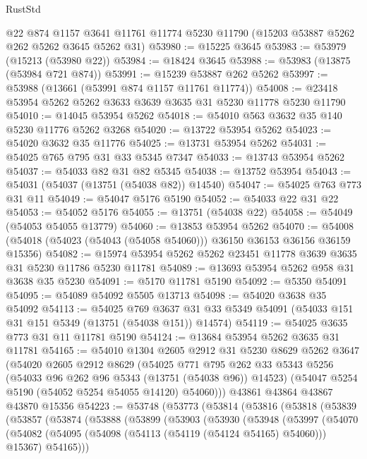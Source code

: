 \begin{lexlean}{RustStd}
\begin{coremodule}
    @22
    @874
    @1157
    @3641
    @11761
    @11774
    @5230
    @11790
    (@15203 @53887 @5262 @262 @5262 @3645 @5262 @31)
@53980 := @15225 @3645
@53983 := @53979 (@15213 (@53980 @22))
@53984 := @18424 @3645
@53988 := @53983 (@13875 (@53984 @721 @874))
@53991 := @15239 @53887 @262 @5262
@53997 := @53988 (@13661 (@53991 @874 @1157 @11761 @11774))
@54008 := @23418 @53954 @5262 @5262 @3633 @3639 @3635 @31 @5230 @11778 @5230 @11790
@54010 := @14045 @53954 @5262
@54018 := @54010 @563 @3632 @35 @140 @5230 @11776 @5262 @3268
@54020 := @13722 @53954 @5262
@54023 := @54020 @3632 @35 @11776
@54025 := @13731 @53954 @5262
@54031 := @54025 @765 @795 @31 @33 @5345 @7347
@54033 := @13743 @53954 @5262
@54037 := @54033 @82 @31 @82 @5345
@54038 := @13752 @53954
@54043 := @54031 (@54037 (@13751 (@54038 @82)) @14540)
@54047 := @54025 @763 @773 @31 @11
@54049 := @54047 @5176 @5190
@54052 := @54033 @22 @31 @22
@54053 := @54052 @5176
@54055 := @13751 (@54038 @22)
@54058 := @54049 (@54053 @54055 @13779)
@54060 := @13853 @53954 @5262
@54070 := @54008 (@54018 (@54023 (@54043 (@54058 @54060))) @36150 @36153 @36156 @36159 @15356)
@54082 := @15974 @53954 @5262 @5262 @23451 @11778 @3639 @3635 @31 @5230 @11786 @5230 @11781
@54089 := @13693 @53954 @5262 @958 @31 @3638 @35 @5230
@54091 := @5170 @11781 @5190
@54092 := @5350 @54091
@54095 := @54089 @54092 @5505 @13713
@54098 := @54020 @3638 @35 @54092
@54113 := @54025
    @769
    @3637
    @31
    @33
    @5349
    @54091
    (@54033 @151 @31 @151 @5349 (@13751 (@54038 @151)) @14574)
@54119 := @54025 @3635 @773 @31 @11 @11781 @5190
@54124 := @13684 @53954 @5262 @3635 @31 @11781
@54165 := @54010
    @1304
    @2605
    @2912
    @31
    @5230
    @8629
    @5262
    @3647
    (@54020
      @2605
      @2912
      @8629
      (@54025
        @771
        @795
        @262
        @33
        @5343
        @5256
        (@54033 @96 @262 @96 @5343 (@13751 (@54038 @96)) @14523)
        (@54047 @5254 @5190 (@54052 @5254 @54055 @14120) @54060)))
    @43861
    @43864
    @43867
    @43870
    @15356
@54223 := @53748
    (@53773
      (@53814
        (@53816
          (@53818
            (@53839
              (@53857
                (@53874
                  (@53888
                    (@53899
                      (@53903
                        (@53930
                          (@53948
                            (@53997
                              (@54070
                                (@54082
                                  (@54095 (@54098 (@54113 (@54119 (@54124 @54165) @54060))) @15367)
                                  @54165)))

\end{coremodule}
\end{lexlean}
